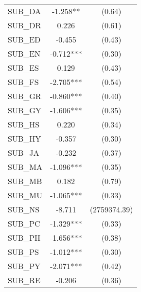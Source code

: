 \begin{table}[htb]
\begin{threeparttable}
\begin{tabular}{l c c}
      SUB\_DA                               & -1.258**               & (0.64)               \\
      SUB\_DR                               & 0.226                  & (0.61)               \\
      SUB\_ED                               & -0.455                 & (0.43)               \\
      SUB\_EN                               & -0.712***              & (0.30)               \\
      SUB\_ES                               & 0.129                  & (0.43)               \\
      SUB\_FS                               & -2.705***              & (0.54)               \\
      SUB\_GR                               & -0.860***              & (0.40)               \\
      SUB\_GY                               & -1.606***              & (0.35)               \\
      SUB\_HS                               & 0.220                  & (0.34)               \\
      SUB\_HY                               & -0.357                 & (0.30)               \\
      SUB\_JA                               & -0.232                 & (0.37)               \\
      SUB\_MA                               & -1.096***              & (0.35)               \\
      SUB\_MB                               & 0.182                  & (0.79)               \\
      SUB\_MU                               & -1.065***              & (0.33)               \\
      SUB\_NS                               & -8.711                 & (2759374.39)         \\
      SUB\_PC                               & -1.329***              & (0.33)               \\
      SUB\_PH                               & -1.656***              & (0.38)               \\
      SUB\_PS                               & -1.012***              & (0.30)               \\
      SUB\_PY                               & -2.071***              & (0.42)               \\
      SUB\_RE                               & -0.206                 & (0.36)               \\

\end{tabular}
\end{threeparttable}
\end{table}
